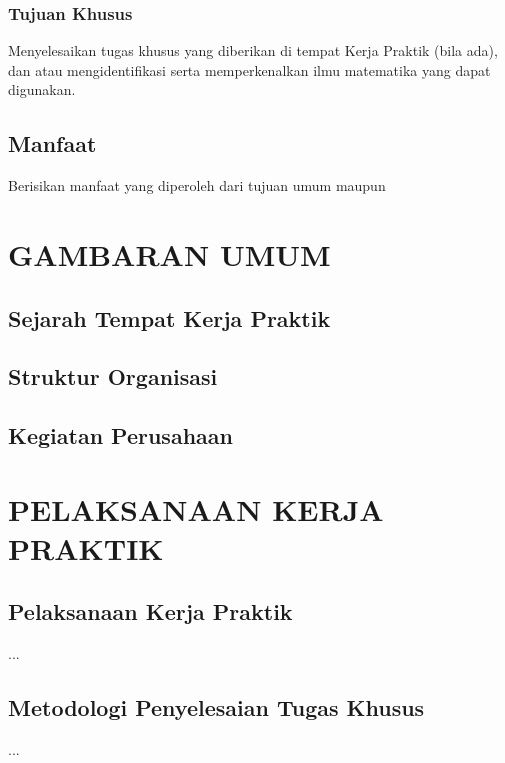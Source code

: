 \documentclass{file/KP-ITS}
\theoremstyle{definition}
\theoremstyle{definition}
\theoremstyle{plain}
\begin{document}
\subsection{Tujuan Khusus}
Menyelesaikan tugas khusus yang diberikan di tempat Kerja Praktik (bila ada), dan atau mengidentifikasi serta memperkenalkan ilmu matematika yang dapat digunakan.

\section{Manfaat}
Berisikan manfaat yang diperoleh dari tujuan umum maupun


\pagebreak
\chapter{GAMBARAN UMUM}

\section{Sejarah Tempat Kerja Praktik}
\section{Struktur Organisasi}
\section{Kegiatan Perusahaan}






\pagebreak
\chapter{PELAKSANAAN KERJA PRAKTIK}

\section{Pelaksanaan Kerja Praktik}
...

\section{Metodologi Penyelesaian Tugas Khusus}
...
\end{document}
